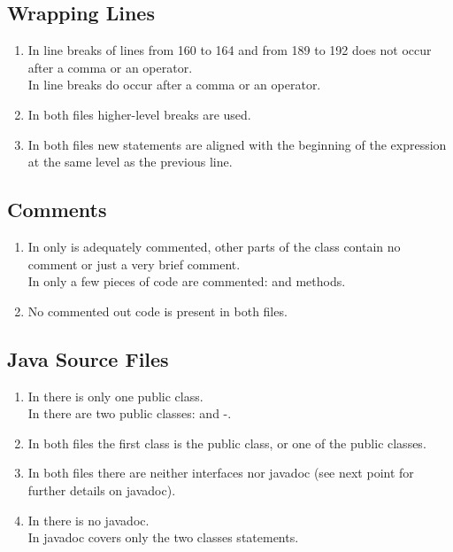 \subsection{Wrapping Lines}
\begin{enumerate}[NUM]
    \item In  line breaks of lines from 160 to 164 and from 189 to 192 does not occur after a comma or an operator.\\
     In  line breaks do occur after a comma or an operator.
    \item In both files higher-level breaks are used. %
    \item In both files new statements are aligned with the beginning of the expression at the same level as the previous line.
\end{enumerate}

\subsection{Comments}
\begin{enumerate}[NUM]
    \item In  only  is adequately commented, other parts of the class contain no comment or just a very brief comment.\\
    In  only a few pieces of code are commented:  and  methods.
    
    \item No commented out code is present in both files.
\end{enumerate}

\subsection{Java Source Files}
\begin{enumerate}[NUM]
    \item In  there is only one public class.\\
    In  there are two public classes:  and -.
    
    \item In both files the first class is the public class, or one of the public classes.
    
    \item In both files there are neither interfaces nor javadoc (see next point for further details on javadoc).
    
    \item In  there is no javadoc.\\
    In  javadoc covers only the two classes statements. 
\end{enumerate}

